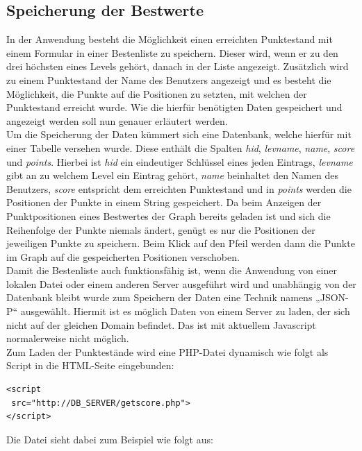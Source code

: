 \documentclass[a4paper,twocolumn]{scrartcl}
\begin{document}
\subsection{Speicherung der Bestwerte}
In der Anwendung besteht die Möglichkeit einen erreichten Punktestand mit einem Formular in einer Bestenliste zu speichern. Dieser wird, wenn er zu den drei höchsten eines Levels gehört, danach in der Liste angezeigt. Zusätzlich wird zu einem Punktestand der Name des Benutzers angezeigt und es besteht die Möglichkeit, die Punkte auf die Positionen zu setzten, mit welchen der Punktestand erreicht wurde. Wie die hierfür benötigten Daten gespeichert und angezeigt werden soll nun genauer erläutert werden.\\
Um die Speicherung der Daten kümmert sich eine Datenbank, welche hierfür mit einer Tabelle versehen wurde. Diese enthält die Spalten \emph{hid}, \emph{levname}, \emph{name}, \emph{score} und \emph{points}. Hierbei ist \emph{hid} ein eindeutiger Schlüssel eines jeden Eintrags, \emph{levname} gibt an zu welchem Level ein Eintrag gehört, \emph{name} beinhaltet den Namen des Benutzers, \emph{score} entspricht dem erreichten Punktestand und in \emph{points} werden die Positionen der Punkte in einem String gespeichert. Da beim Anzeigen der Punktpositionen eines Bestwertes der Graph bereits geladen ist und sich die Reihenfolge der Punkte niemals ändert, genügt es nur die Positionen der jeweiligen Punkte zu speichern. Beim Klick auf den Pfeil werden dann die Punkte im Graph auf die gespeicherten Positionen verschoben.\\
Damit die Bestenliste auch funktionsfähig ist, wenn die Anwendung von einer lokalen Datei oder einem anderen Server ausgeführt wird und unabhängig von der Datenbank bleibt wurde zum Speichern der Daten eine Technik namens „JSON-P“ ausgewählt. Hiermit ist es möglich Daten von einem Server zu laden, der sich nicht auf der gleichen Domain befindet. Das ist mit aktuellem Javascript normalerweise nicht möglich.\\
Zum Laden der Punktestände wird eine PHP-Datei dynamisch wie folgt als Script in die HTML-Seite eingebunden:\\

\begin{lstlisting}
<script
 src="http://DB_SERVER/getscore.php">
</script>
\end{lstlisting}
Die Datei sieht dabei zum Beispiel wie folgt aus:
\end{document}
